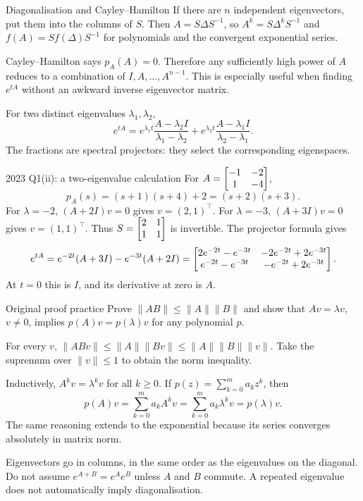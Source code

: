 \begin{method}{Diagonalisation and Cayley--Hamilton}
If there are $n$ independent eigenvectors, put them into the columns of $S$. Then $A=S\Delta S^{-1}$, so $A^k=S\Delta^kS^{-1}$ and $f(A)=Sf(\Delta)S^{-1}$ for polynomials and the convergent exponential series.

Cayley--Hamilton says $p_A(A)=0$. Therefore any sufficiently high power of $A$ reduces to a combination of $I,A,\ldots,A^{n-1}$. This is especially useful when finding $e^{tA}$ without an awkward inverse eigenvector matrix.

For two distinct eigenvalues $\lambda_1,\lambda_2$,
\[e^{tA}=e^{\lambda_1t}\frac{A-\lambda_2I}{\lambda_1-\lambda_2}+e^{\lambda_2t}\frac{A-\lambda_1I}{\lambda_2-\lambda_1}.\]
The fractions are spectral projectors: they select the corresponding eigenspaces.
\end{method}
\begin{worked}{2023 Q1(ii): a two-eigenvalue calculation}
For $A=\begin{bmatrix}-1&-2\\1&-4\end{bmatrix}$,
\[p_A(s)=(s+1)(s+4)+2=(s+2)(s+3).\]
For $\lambda=-2$, $(A+2I)v=0$ gives $v=(2,1)^{\top}$. For $\lambda=-3$, $(A+3I)v=0$ gives $v=(1,1)^{\top}$. Thus $S=\begin{bmatrix}2&1\\1&1\end{bmatrix}$ is invertible. The projector formula gives
\[e^{tA}=e^{-2t}(A+3I)-e^{-3t}(A+2I)
=\begin{bmatrix}2e^{-2t}-e^{-3t}&-2e^{-2t}+2e^{-3t}\\e^{-2t}-e^{-3t}&-e^{-2t}+2e^{-3t}\end{bmatrix}.\]
At $t=0$ this is $I$, and its derivative at zero is $A$.
\end{worked}
\begin{question}{Original proof practice}
Prove $\|AB\|\leq\|A\|\|B\|$ and show that $Av=\lambda v$, $v\ne0$, implies $p(A)v=p(\lambda)v$ for any polynomial $p$.
\end{question}
\begin{answer}
For every $v$, $\|ABv\|\leq\|A\|\|Bv\|\leq\|A\|\|B\|\|v\|$. Take the supremum over $\|v\|\leq1$ to obtain the norm inequality.

Inductively, $A^kv=\lambda^kv$ for all $k\geq0$. If $p(z)=\sum_{k=0}^m a_kz^k$, then
\[p(A)v=\sum_{k=0}^ma_kA^kv=\sum_{k=0}^ma_k\lambda^kv=p(\lambda)v.\]
The same reasoning extends to the exponential because its series converges absolutely in matrix norm.
\end{answer}
\begin{tip}
Eigenvectors go in columns, in the same order as the eigenvalues on the diagonal. Do not assume $e^{A+B}=e^Ae^B$ unless $A$ and $B$ commute. A repeated eigenvalue does not automatically imply diagonalisation.
\end{tip}

